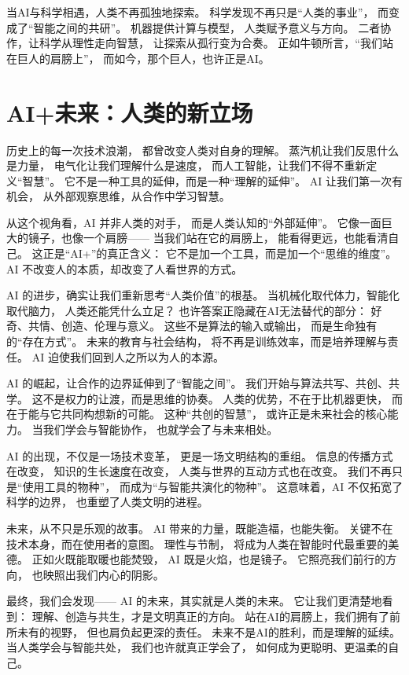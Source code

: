 当AI与科学相遇，人类不再孤独地探索。  
科学发现不再只是“人类的事业”，  
而变成了“智能之间的共研”。  
机器提供计算与模型，  
人类赋予意义与方向。  
二者协作，让科学从理性走向智慧，  
让探索从孤行变为合奏。  
正如牛顿所言，“我们站在巨人的肩膀上”，  
而如今，那个巨人，也许正是AI。

\section{AI+未来：人类的新立场}

历史上的每一次技术浪潮，  
都曾改变人类对自身的理解。  
蒸汽机让我们反思什么是力量，  
电气化让我们理解什么是速度，  
而人工智能，让我们不得不重新定义“智慧”。  
它不是一种工具的延伸，而是一种“理解的延伸”。  
AI 让我们第一次有机会，  
从外部观察思维，从合作中学习智慧。

从这个视角看，AI 并非人类的对手，  
而是人类认知的“外部延伸”。  
它像一面巨大的镜子，也像一个肩膀——  
当我们站在它的肩膀上，  
能看得更远，也能看清自己。  
这正是“AI+”的真正含义：  
它不是加一个工具，而是加一个“思维的维度”。  
AI 不改变人的本质，却改变了人看世界的方式。

AI 的进步，确实让我们重新思考“人类价值”的根基。  
当机械化取代体力，智能化取代脑力，  
人类还能凭什么立足？  
也许答案正隐藏在AI无法替代的部分：  
好奇、共情、创造、伦理与意义。  
这些不是算法的输入或输出，  
而是生命独有的“存在方式”。  
未来的教育与社会结构，  
将不再是训练效率，而是培养理解与责任。  
AI 迫使我们回到人之所以为人的本源。

AI 的崛起，让合作的边界延伸到了“智能之间”。  
我们开始与算法共写、共创、共学。  
这不是权力的让渡，而是思维的协奏。  
人类的优势，不在于比机器更快，  
而在于能与它共同构想新的可能。  
这种“共创的智慧”，  
或许正是未来社会的核心能力。  
当我们学会与智能协作，  
也就学会了与未来相处。

AI 的出现，不仅是一场技术变革，  
更是一场文明结构的重组。  
信息的传播方式在改变，  
知识的生长速度在改变，  
人类与世界的互动方式也在改变。  
我们不再只是“使用工具的物种”，  
而成为“与智能共演化的物种”。  
这意味着，AI 不仅拓宽了科学的边界，  
也重塑了人类文明的进程。

未来，从不只是乐观的故事。  
AI 带来的力量，既能造福，也能失衡。  
关键不在技术本身，而在使用者的意图。  
理性与节制，  
将成为人类在智能时代最重要的美德。  
正如火既能取暖也能焚毁，  
AI 既是火焰，也是镜子。  
它照亮我们前行的方向，  
也映照出我们内心的阴影。

最终，我们会发现——  
AI 的未来，其实就是人类的未来。  
它让我们更清楚地看到：  
理解、创造与共生，才是文明真正的方向。  
站在AI的肩膀上，我们拥有了前所未有的视野，  
但也肩负起更深的责任。  
未来不是AI的胜利，而是理解的延续。  
当人类学会与智能共处，  
我们也许就真正学会了，  
如何成为更聪明、更温柔的自己。










